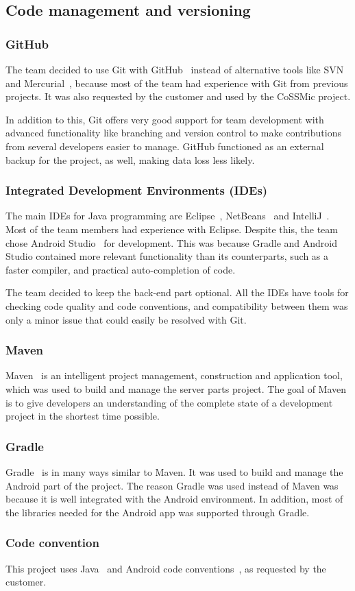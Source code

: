 \subsection{Code management and versioning}
\subsubsection{GitHub}
The team decided to use Git with GitHub~\cite{github} instead of alternative tools like SVN~\cite{svn} and Mercurial~\cite{mercurial}, because most of the team had experience with Git from previous projects. It was also requested by the customer and used by the CoSSMic project. 

In addition to this, Git offers very good support for team development with advanced functionality like branching and version control to make contributions from several developers easier to manage. GitHub functioned as an external backup for the project, as well, making data loss less likely.

\subsubsection{Integrated Development Environments (IDEs)}
The main IDEs for Java programming are Eclipse~\cite{eclipse}, NetBeans~\cite{netbeans} and IntelliJ~\cite{intellij}. Most of the team members had experience with Eclipse. Despite this, the team chose Android Studio~\cite{android-studio} for development. This was because Gradle and Android Studio contained more relevant functionality than its counterparts, such as a faster compiler, and practical auto-completion of code.

The team decided to keep the back-end part optional. All the IDEs have tools for checking code quality and code conventions, and compatibility between them was only a minor issue that could easily be resolved with Git.

\subsubsection{Maven}
Maven~\cite{maven} is an intelligent project management, construction and application tool, which was used to build and manage the server parts project. The goal of Maven is to give developers an understanding of the complete state of a development project in the shortest time possible.

\subsubsection{Gradle}
Gradle~\cite{gradle} is in many ways similar to Maven. It was used to build and manage the Android part of the project. The reason Gradle was used instead of Maven was because it is well integrated with the Android environment. In addition, most of the libraries needed for the Android app was supported through Gradle.

\subsubsection{Code convention}
This project uses Java~\cite{javaconv} and Android code conventions~\cite{androidconv}, as requested by the customer.
